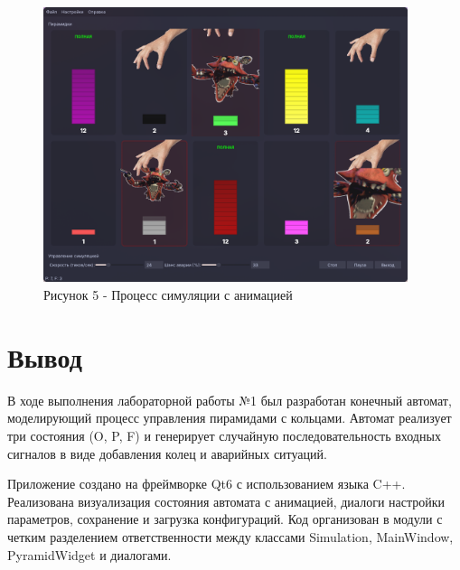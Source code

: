 \documentclass[oneside,a4paper,14pt]{extarticle}
\begin{document}
\begin{figure}[H]
  \centering
  \includegraphics[width=0.95\textwidth]{pics/simulation_running.png}
  \caption*{Рисунок 5 - Процесс симуляции с анимацией}
\end{figure}

\section*{Вывод}

В ходе выполнения лабораторной работы №1 был разработан конечный автомат, моделирующий процесс управления пирамидами с кольцами. Автомат реализует три состояния (O, P, F) и генерирует случайную последовательность входных сигналов в виде добавления колец и аварийных ситуаций.

Приложение создано на фреймворке Qt6 с использованием языка C++. Реализована визуализация состояния автомата с анимацией, диалоги настройки параметров, сохранение и загрузка конфигураций. Код организован в модули с четким разделением ответственности между классами Simulation, MainWindow, PyramidWidget и диалогами.
\end{document}

